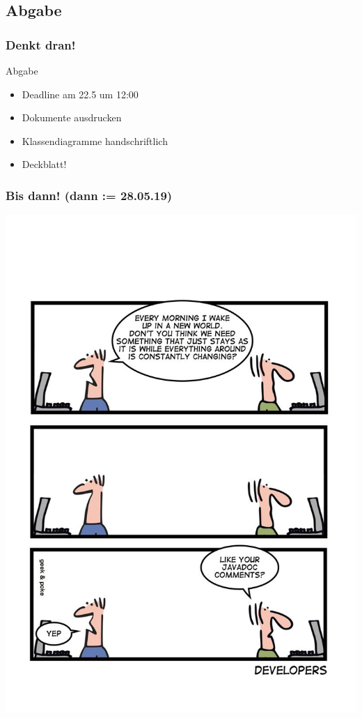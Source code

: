 \documentclass[18pt]{beamer}
\begin{document}
	\subsection{Abgabe}
	\begin{frame}
		\frametitle{Denkt dran!}
		\begin{alertblock}{Abgabe}
			\begin{itemize}
				\item Deadline am 22.5 um 12:00
				\item Dokumente ausdrucken
				\item Klassendiagramme handschriftlich
				\item Deckblatt!
			\end{itemize}
		\end{alertblock}
	\end{frame}
		
	\begin{frame}
		\frametitle{Bis dann! (dann := 28.05.19)}
		\centering
		\includegraphics[scale=0.86]{./comics/geek_and_poke_javadoc.jpg}
	\end{frame}
\end{document}
